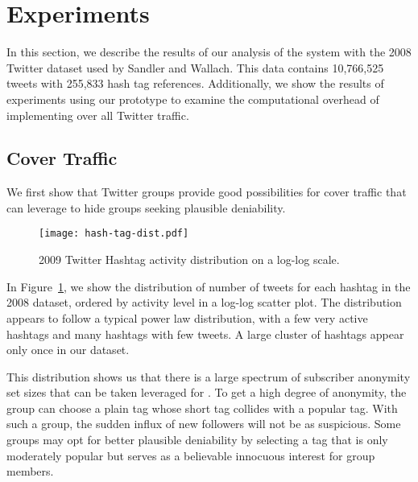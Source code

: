 \section{Experiments}
\label{sec:experiments}

In this section, we describe the results of our analysis of the \hoot system with the 2008 Twitter dataset used by Sandler and Wallach\cite{sandler09}. This data contains 10,766,525 tweets with 255,833 hash tag references. Additionally, we show the results of experiments using our
prototype to examine the computational overhead of implementing \hoot
over all Twitter traffic.

\subsection{Cover Traffic}

We first show that Twitter groups provide good possibilities for cover
traffic that \hoot can leverage to hide groups seeking plausible
deniability.

\begin{figure}
\begin{center}
\texttt{[image: hash-tag-dist.pdf]}
\caption{2009 Twitter Hashtag activity distribution on a log-log
  scale.\label{fig:hash-dist}
}
\end{center}
\end{figure}

In Figure~\ref{fig:hash-dist}, we show the distribution of number of
tweets for each hashtag in the 2008 dataset, ordered by activity level in a log-log scatter
plot. The
distribution appears to follow a typical power law distribution, with a
few very active hashtags and many hashtags with few tweets. A large
cluster of hashtags appear only once in our dataset. 

This distribution shows us that there is a large spectrum of subscriber
anonymity set sizes that can be taken leveraged for \hoot. To get a high
degree of anonymity, the group can choose a plain tag whose short tag
collides with a popular tag. With such a group, the sudden influx of new
followers will not be as suspicious. Some groups may opt
for better plausible deniability by selecting a tag that is only
moderately popular but serves as a believable innocuous interest for
group members.

